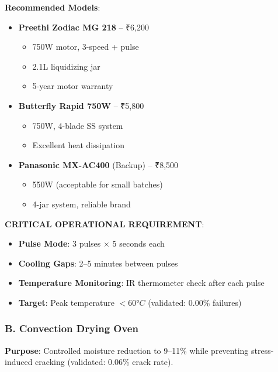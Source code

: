 \documentclass[12pt,a4paper]{article}
\begin{document}
\textbf{Recommended Models}:
\begin{itemize}
    \item \textbf{Preethi Zodiac MG 218} -- ₹6,200
    \begin{itemize}
        \item 750W motor, 3-speed + pulse
        \item 2.1L liquidizing jar
        \item 5-year motor warranty
    \end{itemize}
    \item \textbf{Butterfly Rapid 750W} -- ₹5,800
    \begin{itemize}
        \item 750W, 4-blade SS system
        \item Excellent heat dissipation
    \end{itemize}
    \item \textbf{Panasonic MX-AC400} (Backup) -- ₹8,500
    \begin{itemize}
        \item 550W (acceptable for small batches)
        \item 4-jar system, reliable brand
    \end{itemize}
\end{itemize}

\textbf{CRITICAL OPERATIONAL REQUIREMENT}:
\begin{itemize}
    \item \textbf{Pulse Mode}: 3 pulses $\times$ 5 seconds each
    \item \textbf{Cooling Gaps}: 2--5 minutes between pulses
    \item \textbf{Temperature Monitoring}: IR thermometer check after each pulse
    \item \textbf{Target}: Peak temperature $< 60°C$ (validated: 0.00\% failures)
\end{itemize}

\newpage

\subsubsection{B. Convection Drying Oven}

\textbf{Purpose}: Controlled moisture reduction to 9--11\% while preventing stress-induced cracking (validated: 0.06\% crack rate).
\end{document}
